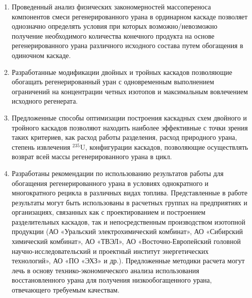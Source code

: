 {\influence} 
\begin{enumerate}
  \item Проведенный анализ физических закономерностей массопереноса компонентов смеси регенерированного урана в ординарном каскаде позволяет однозначно определять условия при которых возможно/невозможно получение необходимого количества конечного продукта на основе регенерированного урана различного исходного состава путем обогащения в одиночном каскаде.
  \item Разработанные модификации двойных и тройных каскадов позволяющие обогащать регенерированный уран с одновременным выполнением ограничений на концентрации четных изотопов и максимальным вовлечением исходного регенерата.
  \item Предложенные способы оптимизации построения каскадных схем двойного и тройного каскадов позволяют находить наиболее эффективные с точки зрения таких критериев, как расход работы разделения, расход природного урана, степень извлечения $^{235}$U, конфигурации каскадов, позволяющие осуществлять возврат всей массы регенерированного урана в цикл.
  \item Разработаны рекомендации по использованию результатов работы для обогащения регенерированного урана в условиях однократного и многократного рецикла в различных видах топлива. Представленные в работе результаты могут быть использованы в расчетных группах на предприятиях и организациях, связанных как с проектированием и построением разделительных каскадов, так и непосредственным производством изотопной продукции (АО «Уральский электрохимический комбинат», АО «Сибирский химический комбинат», АО «ТВЭЛ», АО «Восточно-Европейский головной научно-исследовательский и проектный институт энергетических технологий», АО «ПО «ЭХЗ» и др.). Предложенные методики расчета могут лечь в основу технико-экономического анализа использования восстановленного урана для получения низкообогащенного урана, отвечающего требуемым качествам.  
\end{enumerate}


